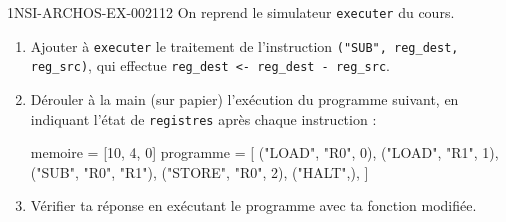 \begin{exercice}{1NSI-ARCHOS-EX-002}{1}{12}
On reprend le simulateur \lstinline{executer} du cours.
\begin{enumerate}
  \item Ajouter à \lstinline{executer} le traitement de l'instruction \lstinline{("SUB", reg_dest, reg_src)}, qui effectue \lstinline{reg_dest <- reg_dest - reg_src}.
  \item Dérouler \og à la main \fg{} (sur papier) l'exécution du programme suivant, en indiquant l'état de \lstinline{registres} après chaque instruction :
\begin{python}
memoire = [10, 4, 0]
programme = [
    ("LOAD", "R0", 0),
    ("LOAD", "R1", 1),
    ("SUB", "R0", "R1"),
    ("STORE", "R0", 2),
    ("HALT",),
]
\end{python}
  \item Vérifier ta réponse en exécutant le programme avec ta fonction modifiée.
\end{enumerate}
\end{exercice}
